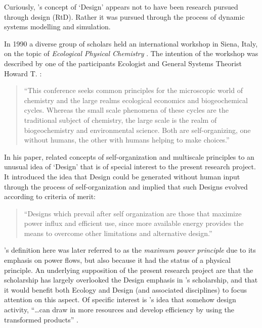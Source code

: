 \documentclass[a4paper,12pt]{article}
\begin{document}
Curiously, \citeauthor{odum_emergy_1991}'s concept of `Design' appears not to have been research \citeauthor{odum_emergy_1991} pursued through design (RtD). Rather it was pursued through the process of dynamic systems modelling and simulation.


In 1990 a diverse group of scholars held an international workshop in Siena, Italy, on the topic of \textit{Ecological Physical Chemistry} \citep{rossi_ecological_1991}. The intention of the workshop was described by one of the participants Ecologist and General Systems Theorist Howard T. \citeauthor{odum_emergy_1991}:

\begin{quotation}
    ``This conference seeks common principles for the microscopic world of chemistry and the large realms ecological economics and biogeochemical cycles. Whereas the small scale phenomena of these cycles are the traditional subject of chemistry, the large scale is the realm of biogeochemistry and environmental science. Both are self-organizing, one without humans, the other with humans helping to make choices.'' \citep[p.~25]{odum_emergy_1991}
\end{quotation}

In his paper, \citeauthor{odum_emergy_1991} related concepts of self-organization and multiscale principles to an unusual idea of `Design' that is of special interest to the present research project. It introduced the idea that Design could be generated without human input through the process of self-organization \citep[p.~40]{odum_emergy_1991} and implied that such Designs evolved according to criteria of merit: 

\begin{quotation}
    ``Designs which prevail after self organization are those that maximize power influx and efficient use, since more available energy provides the means to overcome other limitations and alternative design.'' \citep[p.~26]{odum_emergy_1991}
\end{quotation}

\citeauthor{odum_emergy_1991}'s definition here was later referred to as the \textit{maximum power principle} due to its emphasis on power flows, but also because it had the status of a physical principle. An underlying supposition of the present research project are that the scholarship has largely overlooked the Design emphasis in \citeauthor{odum_emergy_1991}'s scholarship, and that it would benefit both Ecology and Design (and associated disciplines) to focus attention on this aspect. Of specific interest is \citeauthor{odum_emergy_1991}'s idea that somehow design activity, ``\dots can draw in more resources and develop efficiency by using the transformed products''  \citep[p.~40]{odum_emergy_1991}. 
\end{document}
